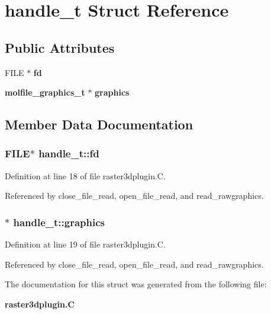 \section{handle\_\-t  Struct Reference}
\label{structhandle__t}
\subsection*{Public Attributes}
\begin{CompactItemize}
\item 
FILE $\ast$ {\bf fd}
\item 
{\bf molfile\_\-graphics\_\-t} $\ast$ {\bf graphics}
\end{CompactItemize}


\subsection{Member Data Documentation}
\subsubsection{\setlength{\rightskip}{0pt plus 5cm}FILE$\ast$ handle\_\-t::fd}\label{structhandle__t_m0}




Definition at line 18 of file raster3dplugin.C.

Referenced by close\_\-file\_\-read, open\_\-file\_\-read, and read\_\-rawgraphics.
\subsubsection{$\ast$ handle\_\-t::graphics}\label{structhandle__t_m1}




Definition at line 19 of file raster3dplugin.C.

Referenced by close\_\-file\_\-read, open\_\-file\_\-read, and read\_\-rawgraphics.

The documentation for this struct was generated from the following file:\begin{CompactItemize}
\item 
{\bf raster3dplugin.C}\end{CompactItemize}
